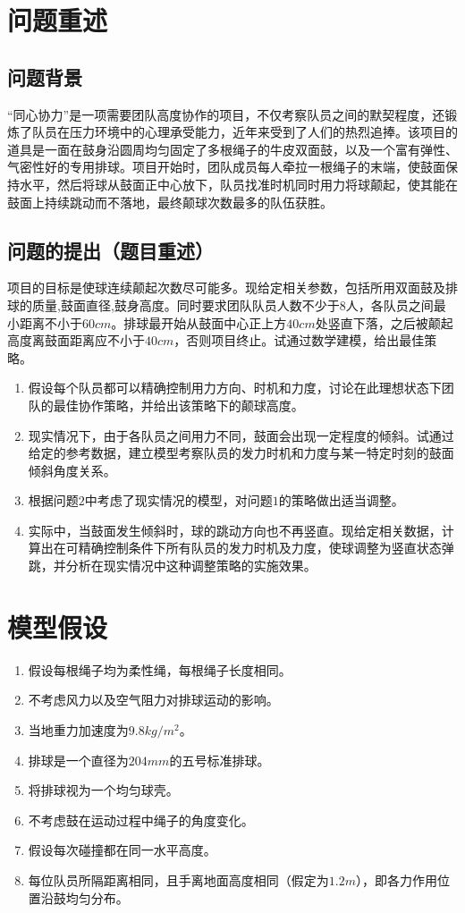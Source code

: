 \documentclass{cumcm}
\begin{document}
\newpage
\section{问题重述}
\subsection{问题背景}
“同心协力”是一项需要团队高度协作的项目，不仅考察队员之间的默契程度，还锻炼了队员在压力环境中的心理承受能力，近年来受到了人们的热烈追捧。该项目的道具是一面在鼓身沿圆周均匀固定了多根绳子的牛皮双面鼓，以及一个富有弹性、气密性好的专用排球。项目开始时，团队成员每人牵拉一根绳子的末端，使鼓面保持水平，然后将球从鼓面正中心放下，队员找准时机同时用力将球颠起，使其能在鼓面上持续跳动而不落地，最终颠球次数最多的队伍获胜。
\subsection{问题的提出（题目重述）}
项目的目标是使球连续颠起次数尽可能多。现给定相关参数，包括所用双面鼓及排球的质量,鼓面直径,鼓身高度。同时要求团队队员人数不少于$8$人，各队员之间最小距离不小于$60cm$。排球最开始从鼓面中心正上方$40cm$处竖直下落，之后被颠起高度离鼓面距离应不小于$40cm$，否则项目终止。试通过数学建模，给出最佳策略。
\begin{enumerate}[(1)]
\item 假设每个队员都可以精确控制用力方向、时机和力度，讨论在此理想状态下团队的最佳协作策略，并给出该策略下的颠球高度。
\item 现实情况下，由于各队员之间用力不同，鼓面会出现一定程度的倾斜。试通过给定的参考数据，建立模型考察队员的发力时机和力度与某一特定时刻的鼓面倾斜角度关系。
\item 根据问题$2$中考虑了现实情况的模型，对问题$1$的策略做出适当调整。
\item 实际中，当鼓面发生倾斜时，球的跳动方向也不再竖直。现给定相关数据，计算出在可精确控制条件下所有队员的发力时机及力度，使球调整为竖直状态弹跳，并分析在现实情况中这种调整策略的实施效果。
\end{enumerate}

\section{模型假设}
\begin{enumerate}
\item 假设每根绳子均为柔性绳，每根绳子长度相同。
\item 不考虑风力以及空气阻力对排球运动的影响。
\item 当地重力加速度为$9.8kg/m^2$。
\item 排球是一个直径为$204mm$的五号标准排球。
\item 将排球视为一个均匀球壳。
\item 不考虑鼓在运动过程中绳子的角度变化。
 \item 假设每次碰撞都在同一水平高度。
\item 每位队员所隔距离相同，且手离地面高度相同（假定为$1.2m$），即各力作用位置沿鼓均匀分布。
\end{enumerate}
\end{document}
